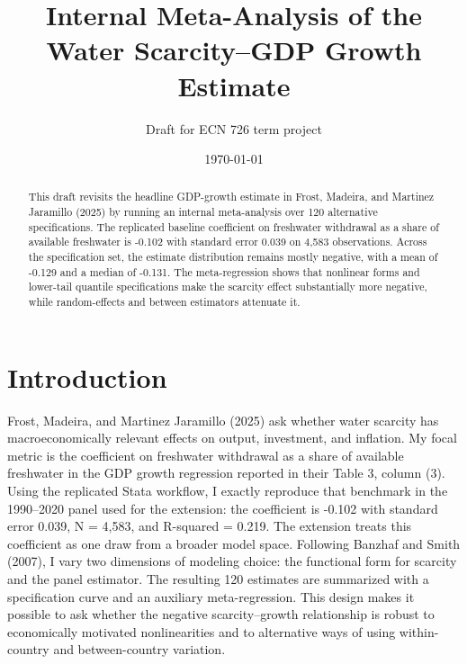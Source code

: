 \documentclass[11pt]{article}
\title{Internal Meta-Analysis of the Water Scarcity--GDP Growth Estimate}
\author{Draft for ECN 726 term project}
\date{\today}
\begin{document}
\maketitle
\begin{abstract}
This draft revisits the headline GDP-growth estimate in Frost, Madeira, and Martinez Jaramillo (2025) by running an internal meta-analysis over 120 alternative specifications. The replicated baseline coefficient on freshwater withdrawal as a share of available freshwater is -0.102 with standard error 0.039 on 4,583 observations. Across the specification set, the estimate distribution remains mostly negative, with a mean of -0.129 and a median of -0.131. The meta-regression shows that nonlinear forms and lower-tail quantile specifications make the scarcity effect substantially more negative, while random-effects and between estimators attenuate it.
\end{abstract}
\section{Introduction}
Frost, Madeira, and Martinez Jaramillo (2025) ask whether water scarcity has macroeconomically relevant effects on output, investment, and inflation. My focal metric is the coefficient on freshwater withdrawal as a share of available freshwater in the GDP growth regression reported in their Table 3, column (3). Using the replicated Stata workflow, I exactly reproduce that benchmark in the 1990--2020 panel used for the extension: the coefficient is -0.102 with standard error 0.039, N = 4,583, and R-squared = 0.219.
The extension treats this coefficient as one draw from a broader model space. Following Banzhaf and Smith (2007), I vary two dimensions of modeling choice: the functional form for scarcity and the panel estimator. The resulting 120 estimates are summarized with a specification curve and an auxiliary meta-regression. This design makes it possible to ask whether the negative scarcity--growth relationship is robust to economically motivated nonlinearities and to alternative ways of using within-country and between-country variation.
\end{document}
